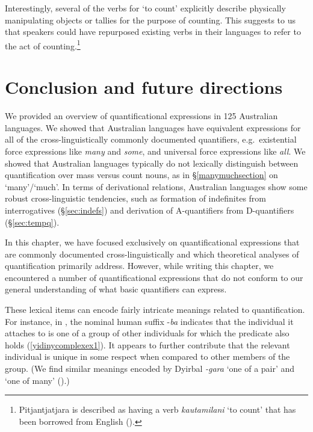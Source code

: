 \documentclass[12pt,egregdoesnotlikesansseriftitles]{scrartcl}
\begin{document}
Interestingly, several of the verbs for `to count' explicitly describe physically manipulating objects or tallies for the purpose of counting. This suggests to us that speakers could have repurposed existing verbs in their languages to refer to the act of counting.\footnote{Pitjantjatjara is described as having a verb \textit{kautamilani} `to count' that has been borrowed from English (\citealt[36]{goddard92}).}

\section{Conclusion and future directions}

We provided an overview of quantificational expressions in 125 Australian languages. We showed that Australian languages have equivalent expressions for all of the cross-linguistically commonly documented quantifiers, e.g.\ existential force expressions like \textit{many} and \textit{some}, and universal force expressions like \textit{all}. We showed that Australian languages typically do not lexically distinguish between quantification over mass versus count nouns, as in \S\ref{manymuchsection} on `many'/`much'. %
In terms of derivational relations, Australian languages show some  robust cross-linguistic tendencies, such as formation of indefinites from interrogatives (\S\ref{sec:indefs}) and derivation of A-quantifiers from D-quantifiers (\S\ref{sec:tempq}).

In this chapter, we have focused exclusively on quantificational expressions that are commonly documented cross-linguistically and which theoretical analyses of quantification primarily address. However, while writing this chapter, we encountered a number of quantificational expressions that do not conform to our general understanding of what basic quantifiers can express. 

These lexical items can encode fairly intricate meanings related to quantification. For instance, in  {}, the nominal human suffix -\textit{ba} indicates that the individual it attaches to is one of a group of other individuals for which the predicate also holds (\ref{yidinycomplexex1}). It appears to further contribute that the relevant individual is unique in some respect when compared to other members of the group. (We find similar meanings encoded by Dyirbal \textit{-gara} `one of a pair' and {} `one of many' (\citealt[230--231]{dixon72}).)
\end{document}
